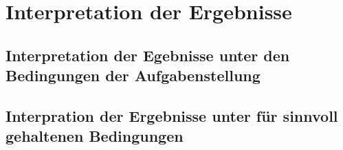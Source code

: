 \chapter{Interpretation der Ergebnisse}
\section{Interpretation der Egebnisse unter den Bedingungen der Aufgabenstellung}
\section{Interpration der Ergebnisse unter für sinnvoll gehaltenen Bedingungen}